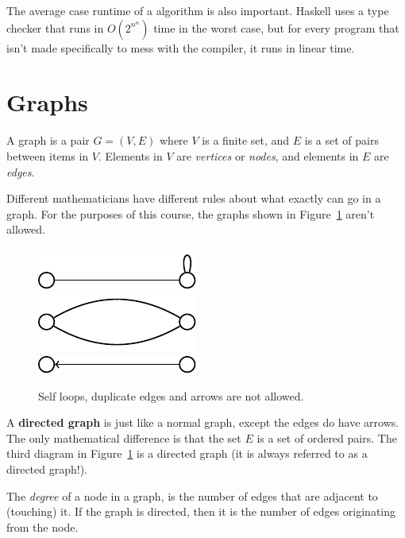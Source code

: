 
The average case runtime of a algorithm is also important. Haskell uses a type
checker that runs in $O(2^{n^n})$ time in the worst case, but for every program
that isn't made specifically to mess with the compiler, it runs in linear time.

\section{Graphs}

A graph is a pair $G = (V,E)$ where $V$ is a finite set, and $E$ is a set of
pairs between items in $V$. Elements in $V$ are \textit{vertices} or
\textit{nodes}, and elements in $E$ are \textit{edges}.

Different mathematicians have different rules about what exactly can go in a
graph. For the purposes of this course, the graphs shown in
Figure~\ref{fig:bad-graphs} aren't allowed.

\begin{figure}[h]
  \centering
  \includegraphics{diagrams/self-loops}\\
  \includegraphics{diagrams/multiple-edges}\\
  \includegraphics{diagrams/directed-graph}
  \caption{Self loops, duplicate edges and arrows are not allowed.}
  \label{fig:bad-graphs}
\end{figure}

A \textbf{directed graph} is just like a normal graph, except the edges do have
arrows. The only mathematical difference is that the set $E$ is a set of ordered
pairs. The third diagram in Figure~\ref{fig:bad-graphs} is a directed graph (it
is always referred to as a directed graph!).

The \textit{degree} of a node in a graph, is the number of edges that are
adjacent to (touching) it. If the graph is directed, then it is the number of
edges originating from the node.

